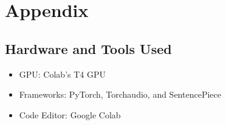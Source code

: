 \documentclass[12pt,a4paper]{report}
\begin{document}
\appendix
\chapter{Appendix}
\section{Hardware and Tools Used}
\begin{itemize}
    \item GPU: Colab's T4 GPU
    \item Frameworks: PyTorch, Torchaudio, and SentencePiece
    \item Code Editor: Google Colab
\end{itemize}
\end{document}
